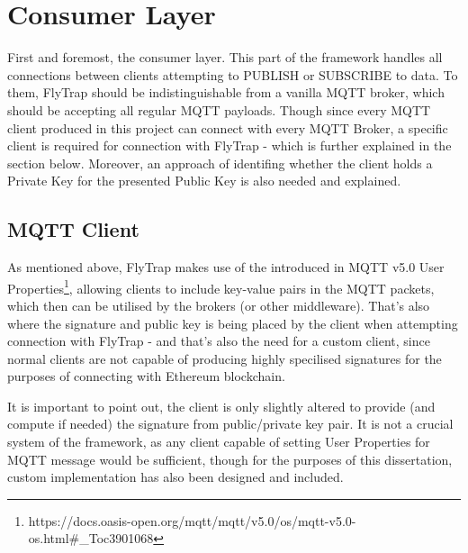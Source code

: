 \section{Consumer Layer}
First and foremost, the consumer layer. This part of the framework handles all connections between clients attempting to PUBLISH or SUBSCRIBE to data. To them, FlyTrap should be indistinguishable from a vanilla MQTT broker, which should be accepting all regular MQTT payloads. Though since every MQTT client produced in this project can connect with every MQTT Broker, a specific client is required for connection with FlyTrap - which is further explained in the section below. Moreover, an approach of identifing whether the client holds a Private Key for the presented Public Key is also needed and explained. 
\subsection{MQTT Client}
As mentioned above, FlyTrap makes use of the introduced in MQTT v5.0 User Properties\footnote{https://docs.oasis-open.org/mqtt/mqtt/v5.0/os/mqtt-v5.0-os.html\#\_Toc3901068}, allowing clients to include key-value pairs in the MQTT packets, which then can be utilised by the brokers (or other middleware). That's also where the signature and public key is being placed by the client when attempting connection with FlyTrap - and that's also the need for a custom client, since normal clients are not capable of producing highly specilised signatures for the purposes of connecting with Ethereum blockchain.

It is important to point out, the client is only slightly altered to provide (and compute if needed) the signature from public/private key pair. It is not a crucial system of the framework, as any client capable of setting User Properties for MQTT message would be sufficient, though for the purposes of this dissertation, custom implementation has also been designed and included.

